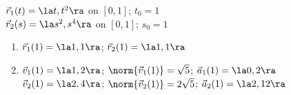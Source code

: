 {$\vec r_1(t) = \la t,t^2\ra$ on $[0,1]$; $t_0 = 1$\\
$\vec r_2(s) = \la s^2,s^4\ra$ on $[0,1]$; $s_0 = 1$
}
{
\begin{enumerate}
	\item $\vec r_1(1) = \la 1,1\ra$; $\vec r_2(1) = \la 1,1\ra$
	\item	$\vec v_1(1) = \la 1,2\ra$; $\norm{\vec v_1(1)} = \sqrt{5}$; $\vec a_1(1) = \la 0,2\ra$\\
			$\vec v_2(1) = \la 2,4\ra$; $\norm{\vec v_2(1)} = 2\sqrt{5}$; $\vec a_2(1) = \la 2,12\ra$
\end{enumerate}
}